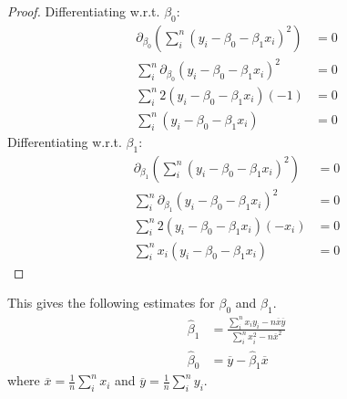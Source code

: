 \documentclass{article}
\begin{document}
\begin{proof}
    Differentiating w.r.t. \(\beta_0\):
    \begin{align*}
        \partial_{\beta_0}\left( \sum_i^n \left( y_i - \beta_0 - \beta_1 x_i \right)^2 \right) & = 0 \\
        \sum_i^n \partial_{\beta_0} \left( y_i - \beta_0 - \beta_1 x_i \right)^2               & = 0 \\
        \sum_i^n 2 \left( y_i - \beta_0 - \beta_1 x_i \right)\left( -1 \right)                 & = 0 \\
        \sum_i^n \left( y_i - \beta_0 - \beta_1 x_i \right)                                    & = 0
    \end{align*}
    Differentiating w.r.t. \(\beta_1\):
    \begin{align*}
        \partial_{\beta_1}\left( \sum_i^n \left( y_i - \beta_0 - \beta_1 x_i \right)^2 \right) & = 0 \\
        \sum_i^n \partial_{\beta_1} \left( y_i - \beta_0 - \beta_1 x_i \right)^2               & = 0 \\
        \sum_i^n 2 \left( y_i - \beta_0 - \beta_1 x_i \right)\left( -x_i \right)               & = 0 \\
        \sum_i^n x_i \left( y_i - \beta_0 - \beta_1 x_i \right)                                & = 0
    \end{align*}
\end{proof}
This gives the following estimates for \(\beta_0\) and \(\beta_1\).
\begin{align*}
    \hat{\beta}_1 & = \frac{\sum_i^n x_i y_i - n\overline{x}\overline{y}}{\sum_i^n x_i^2 - n\overline{x}^2} \\
    \hat{\beta}_0 & = \overline{y} - \hat{\beta}_1\overline{x}
\end{align*}
where \(\overline{x} = \frac{1}{n}\sum_i^n x_i\) and \(\overline{y} = \frac{1}{n}\sum_i^n y_i\).
\end{document}
